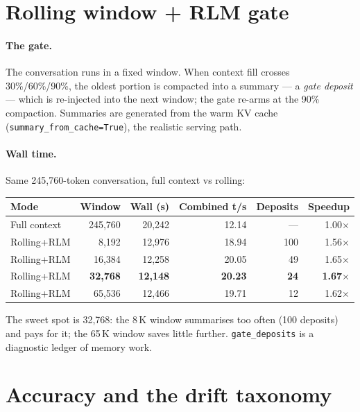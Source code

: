 \documentclass{article}
\begin{document}
\section{Rolling window + RLM gate}

\paragraph{The gate.} The conversation runs in a fixed window. When context fill
crosses 30\%/60\%/90\%, the oldest portion is compacted into a summary --- a \emph{gate
deposit} --- which is re-injected into the next window; the gate re-arms at the 90\%
compaction. Summaries are generated from the warm KV cache
(\texttt{summary\_from\_cache=True}), the realistic serving path.

\paragraph{Wall time.} Same 245{,}760-token conversation, full context vs rolling:

\begin{center}
\begin{tabular}{@{}lrrrrr@{}}
\toprule
Mode & Window & Wall (s) & Combined t/s & Deposits & Speedup \\
\midrule
Full context & 245{,}760 & 20{,}242 & 12.14 & --- & 1.00$\times$ \\
Rolling+RLM   & 8{,}192  & 12{,}976 & 18.94 & 100 & 1.56$\times$ \\
Rolling+RLM   & 16{,}384 & 12{,}258 & 20.05 & 49 & 1.65$\times$ \\
Rolling+RLM   & \textbf{32{,}768} & \textbf{12{,}148} & \textbf{20.23} & \textbf{24} & \textbf{1.67$\times$} \\
Rolling+RLM   & 65{,}536 & 12{,}466 & 19.71 & 12 & 1.62$\times$ \\
\bottomrule
\end{tabular}
\end{center}

The sweet spot is 32{,}768: the 8\,K window summarises too often (100 deposits) and
pays for it; the 65\,K window saves little further. \texttt{gate\_deposits} is a
diagnostic ledger of memory work.

\section{Accuracy and the drift taxonomy}
\label{sec:accuracy}
\end{document}
